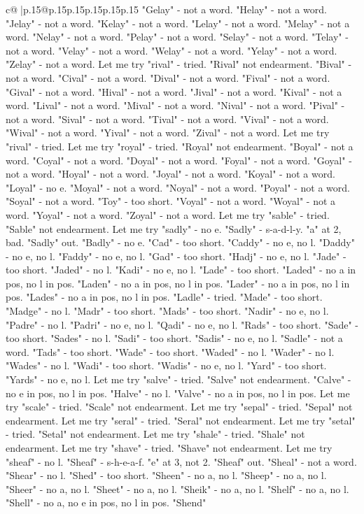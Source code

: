 \documentclass{article}
\begin{document}
{\begin{supertabular}{c@{$\;$}|p{.15\linewidth}@{}p{.15\linewidth}p{.15\linewidth}p{.15\linewidth}p{.15\linewidth}p{.15\linewidth}}
{{{"Gelay" {-} not a word. "Helay" {-} not a word. "Jelay" {-} not a word. "Kelay" {-} not a word. "Lelay" {-} not a word. "Melay" {-} not a word. "Nelay" {-} not a word. "Pelay" {-} not a word. "Selay" {-} not a word. "Telay" {-} not a word. "Velay" {-} not a word. "Welay" {-} not a word. "Yelay" {-} not a word. "Zelay" {-} not a word. Let me try "rival" {-} tried. "Rival" not endearment. "Bival" {-} not a word. "Cival" {-} not a word. "Dival" {-} not a word. "Fival" {-} not a word. "Gival" {-} not a word. "Hival" {-} not a word. "Jival" {-} not a word. "Kival" {-} not a word. "Lival" {-} not a word. "Mival" {-} not a word. "Nival" {-} not a word. "Pival" {-} not a word. "Sival" {-} not a word. "Tival" {-} not a word. "Vival" {-} not a word. "Wival" {-} not a word. "Yival" {-} not a word. "Zival" {-} not a word. Let me try "rival" {-} tried. Let me try "royal" {-} tried. "Royal" not endearment. "Boyal" {-} not a word. "Coyal" {-} not a word. "Doyal" {-} not a word. "Foyal" {-} not a word. "Goyal" {-} not a word. "Hoyal" {-} not a word. "Joyal" {-} not a word. "Koyal" {-} not a word. "Loyal" {-} no e. "Moyal" {-} not a word. "Noyal" {-} not a word. "Poyal" {-} not a word. "Soyal" {-} not a word. "Toy" {-} too short. "Voyal" {-} not a word. "Woyal" {-} not a word. "Yoyal" {-} not a word. "Zoyal" {-} not a word. Let me try "sable" {-} tried. "Sable" not endearment. Let me try "sadly" {-} no e. "Sadly" {-} s{-}a{-}d{-}l{-}y. "a" at 2, bad. "Sadly" out. "Badly" {-} no e. "Cad" {-} too short. "Caddy" {-} no e, no l. "Daddy" {-} no e, no l. "Faddy" {-} no e, no l. "Gad" {-} too short. "Hadj" {-} no e, no l. "Jade" {-} too short. "Jaded" {-} no l. "Kadi" {-} no e, no l. "Lade" {-} too short. "Laded" {-} no a in pos, no l in pos. "Laden" {-} no a in pos, no l in pos. "Lader" {-} no a in pos, no l in pos. "Lades" {-} no a in pos, no l in pos. "Ladle" {-} tried. "Made" {-} too short. "Madge" {-} no l. "Madr" {-} too short. "Mads" {-} too short. "Nadir" {-} no e, no l. "Padre" {-} no l. "Padri" {-} no e, no l. "Qadi" {-} no e, no l. "Rads" {-} too short. "Sade" {-} too short. "Sades" {-} no l. "Sadi" {-} too short. "Sadis" {-} no e, no l. "Sadle" {-} not a word. "Tads" {-} too short. "Wade" {-} too short. "Waded" {-} no l. "Wader" {-} no l. "Wades" {-} no l. "Wadi" {-} too short. "Wadis" {-} no e, no l. "Yard" {-} too short. "Yards" {-} no e, no l. Let me try "salve" {-} tried. "Salve" not endearment. "Calve" {-} no e in pos, no l in pos. "Halve" {-} no l. "Valve" {-} no a in pos, no l in pos. Let me try "scale" {-} tried. "Scale" not endearment. Let me try "sepal" {-} tried. "Sepal" not endearment. Let me try "seral" {-} tried. "Seral" not endearment. Let me try "setal" {-} tried. "Setal" not endearment. Let me try "shale" {-} tried. "Shale" not endearment. Let me try "shave" {-} tried. "Shave" not endearment. Let me try "sheaf" {-} no l. "Sheaf" {-} s{-}h{-}e{-}a{-}f. "e" at 3, not 2. "Sheaf" out. "Sheal" {-} not a word. "Shear" {-} no l. "Shed" {-} too short. "Sheen" {-} no a, no l. "Sheep" {-} no a, no l. "Sheer" {-} no a, no l. "Sheet" {-} no a, no l. "Sheik" {-} no a, no l. "Shelf" {-} no a, no l. "Shell" {-} no a, no e in pos, no l in pos. "Shend" }}}
\end{supertabular}}
\end{document}
